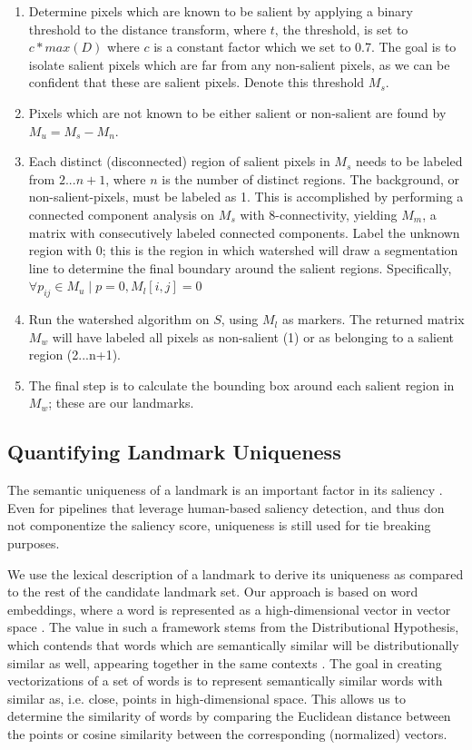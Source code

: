 \begin{enumerate}
\item
Determine pixels which are known to be salient by applying a binary threshold to the distance transform, where $t$, the threshold, is set to $c * max(D)$ where $c$ is a constant factor which we set to 0.7. The goal is to isolate salient pixels which are far from any non-salient pixels, as we can be confident that these are salient pixels. Denote this threshold $M_s$.

\item
Pixels which are not known to be either salient or non-salient are found by $M_u = M_s - M_n$.

\item
Each distinct (disconnected) region of salient pixels in $M_s$ needs to be labeled from $2...n+1$, where $n$ is the number of distinct regions. The background, or non-salient-pixels, must be labeled as 1. This is accomplished by performing a connected component analysis on $M_s$ with 8-connectivity, yielding $M_m$, a matrix with consecutively labeled connected components. 
Label the unknown region with 0; this is the region in which watershed will draw a segmentation line to determine the final boundary around the salient regions. Specifically, $\forall p_{ij} \in M_u \mid p=0, M_l[i, j] = 0$

\item
Run the watershed algorithm on $S$, using $M_l$ as markers. The returned matrix $M_w$ will have labeled all pixels as non-salient (1) or as belonging to a salient region (2...n+1).

\item
The final step is to calculate the bounding box around each salient region in $M_w$; these are our landmarks.
\end{enumerate}

\subsection{Quantifying Landmark Uniqueness}\label{sec:unique}

The semantic uniqueness of a landmark is an important factor in its saliency \cite{caduff2008assessment}. Even for pipelines that leverage human-based saliency detection, and thus don not componentize the saliency score, uniqueness is still used for tie breaking purposes.

We use the lexical description of a landmark to derive its uniqueness as compared to the rest of the candidate landmark set. Our approach is based on word embeddings, where a word is represented as a high-dimensional vector in vector space \cite{goldberg2014word2vec}. The value in such a framework stems from the Distributional Hypothesis, which contends that words which are semantically similar will be distributionally similar as well, appearing together in the same contexts \cite{harris1954distributional}. The goal in creating vectorizations of a set of words is to represent semantically similar words with similar as, i.e. close, points in high-dimensional space. This allows us to determine the similarity of words by comparing the Euclidean distance between the points or cosine similarity between the corresponding (normalized) vectors.

